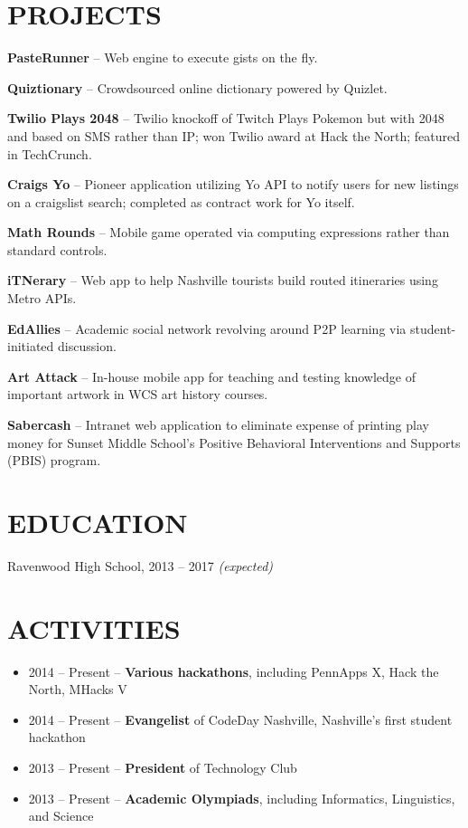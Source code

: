 \documentclass{res}
\begin{document}
\section{PROJECTS}

\textbf{PasteRunner} -- Web engine to execute gists on the fly.

\textbf{Quiztionary} -- Crowdsourced online dictionary powered by Quizlet.

\textbf{Twilio Plays 2048} -- Twilio knockoff of Twitch Plays Pokemon but with 2048 and based on SMS rather than IP; won Twilio award at Hack the North; featured in TechCrunch.

\textbf{Craigs Yo} -- Pioneer application utilizing Yo API to notify users for new listings on a craigslist search; completed as contract work for Yo itself.

\textbf{Math Rounds} -- Mobile game operated via computing expressions rather than standard controls.

\textbf{iTNerary} -- Web app to help Nashville tourists build routed itineraries using Metro APIs.

\textbf{EdAllies} -- Academic social network revolving around P2P learning via student-initiated discussion.

\textbf{Art Attack} -- In-house mobile app for teaching and testing knowledge of important artwork in WCS art history courses.

\textbf{Sabercash} -- Intranet web application to eliminate expense of printing play money for Sunset Middle School's Positive Behavioral Interventions and Supports (PBIS) program.

\section{EDUCATION}

Ravenwood High School, 2013 -- 2017 \textit {(expected)}

\section{ACTIVITIES}

\begin{itemize} \itemsep -2pt
  \item 2014 -- Present -- \textbf{Various hackathons}, including PennApps X, Hack the North, MHacks V
  \item 2014 -- Present -- \textbf{Evangelist} of CodeDay Nashville, Nashville's first student hackathon
  \item 2013 -- Present -- \textbf{President} of Technology Club
  \item 2013 -- Present -- \textbf{Academic Olympiads}, including Informatics, Linguistics, and Science
\end{itemize}
\end{document}
